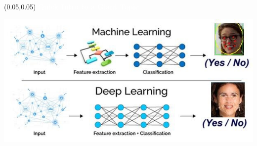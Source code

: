 \documentclass[aspectratio=169]{beamer} %
\begin{document}
\begin{frame}{}
    \setlength{\TPHorizModule}{\textwidth}
    \setlength{\TPVertModule}{\textwidth}
    \begin{textblock}{0.74}(0.05,0.05)
        \bfseries\large\textcolor{white}{Quick Intro to a Giant Topic}
    \end{textblock}
    \bigskip
    \includegraphics[width=1.0\linewidth,height=0.7\textheight]{../images/Diff-ML-DL.jpg}

\end{frame}
\end{document}
